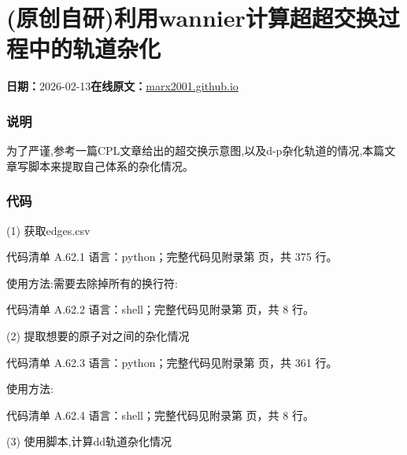 \documentclass[lang=cn,scheme=chinese,color=blue,device=normal,toc=onecol,math=cm]{elegantbook}
\begin{document}
\section{(原创自研)利用wannier计算超超交换过程中的轨道杂化}
\begin{articlemeta}
\textbf{日期：}2026-02-13\hfill\textbf{在线原文：}\href{https://marx2001.github.io/sci-note\_posts/20260213-dp}{marx2001.github.io}
\end{articlemeta}

\subsubsection{说明}


为了严谨,参考一篇CPL文章给出的超交换示意图,以及d-p杂化轨道的情况,本篇文章写脚本来提取自己体系的杂化情况。\par


\subsubsection{代码}


(1) 获取edges.csv\par


\begin{codeindexbox}{代码清单 A.62.1}
语言：python；完整代码见附录第 \pageref{code:62:1} 页，共 375 行。
\end{codeindexbox}


使用方法:需要去除掉所有的换行符:\par


\begin{codeindexbox}{代码清单 A.62.2}
语言：shell；完整代码见附录第 \pageref{code:62:2} 页，共 8 行。
\end{codeindexbox}


(2) 提取想要的原子对之间的杂化情况\par


\begin{codeindexbox}{代码清单 A.62.3}
语言：python；完整代码见附录第 \pageref{code:62:3} 页，共 361 行。
\end{codeindexbox}


使用方法:\par


\begin{codeindexbox}{代码清单 A.62.4}
语言：shell；完整代码见附录第 \pageref{code:62:4} 页，共 8 行。
\end{codeindexbox}


(3) 使用脚本,计算dd轨道杂化情况\par
\end{document}
